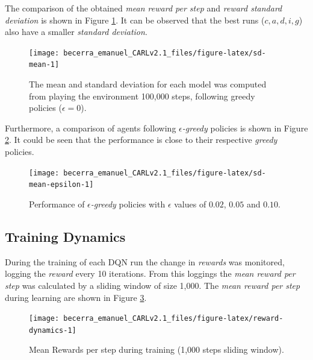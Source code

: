 \documentclass[
  12pt,
  openany]{book}
\begin{document}
The comparison of the obtained \emph{mean reward per step} and \emph{reward standard deviation} is shown in Figure \ref{fig:sd-mean}. It can be observed that the best runs (\(c,a,d,i,g\)) also have a smaller \emph{standard deviation}.



\begin{figure}

{\centering \texttt{[image: becerra\_emanuel\_CARLv2.1\_files/figure-latex/sd-mean-1]} 

}

\caption{The mean and standard deviation for each model was computed from playing the environment 100,000 steps, following greedy policies (\(\epsilon=0\)).}\label{fig:sd-mean}
\end{figure}

Furthermore, a comparison of agents following \emph{\(\epsilon\)-greedy} policies is shown in Figure \ref{fig:sd-mean-epsilon}. It could be seen that the performance is close to their respective \emph{greedy} policies.



\begin{figure}

{\centering \texttt{[image: becerra\_emanuel\_CARLv2.1\_files/figure-latex/sd-mean-epsilon-1]} 

}

\caption{Performance of \emph{\(\epsilon\)-greedy} policies with \(\epsilon\) values of \(0.02\), \(0.05\) and \(0.10\).}\label{fig:sd-mean-epsilon}
\end{figure}

\hypertarget{training-dynamics}{%
\subsection{Training Dynamics}\label{training-dynamics}}

During the training of each DQN run the change in \emph{rewards} was monitored, logging the \emph{reward} every 10 iterations. From this loggings the \emph{mean reward per step} was calculated by a sliding window of size 1,000. The \emph{mean reward per step} during learning are shown in Figure \ref{fig:reward-dynamics}.



\begin{figure}

{\centering \texttt{[image: becerra\_emanuel\_CARLv2.1\_files/figure-latex/reward-dynamics-1]} 

}

\caption{Mean Rewards per step during training (1,000 steps sliding window).}\label{fig:reward-dynamics}
\end{figure}
\end{document}
